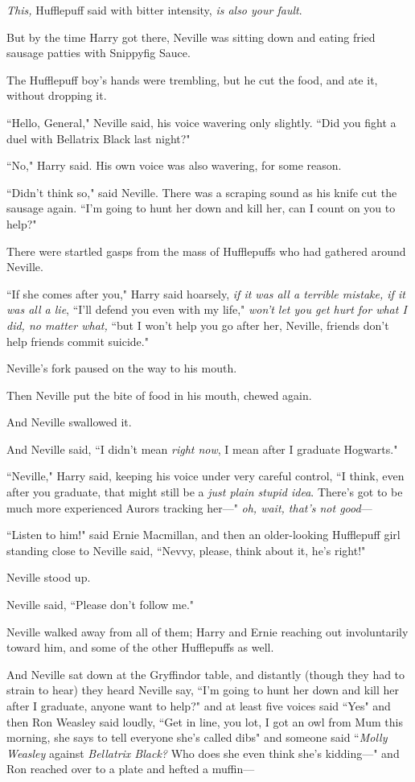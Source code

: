 \emph{This,} Hufflepuff said with bitter intensity, \emph{is also your fault}.

But by the time Harry got there, Neville was sitting down and eating fried sausage patties with Snippyfig Sauce.

The Hufflepuff boy's hands were trembling, but he cut the food, and ate it, without dropping it.

``Hello, General," Neville said, his voice wavering only slightly. ``Did you fight a duel with Bellatrix Black last night?"

``No," Harry said. His own voice was also wavering, for some reason.

``Didn't think so," said Neville. There was a scraping sound as his knife cut the sausage again. ``I'm going to hunt her down and kill her, can I count on you to help?"

There were startled gasps from the mass of Hufflepuffs who had gathered around Neville.

``If she comes after you," Harry said hoarsely, \emph{if it was all a terrible mistake, if it was all a lie}, ``I'll defend you even with my life," \emph{won't let you get hurt for what I did, no matter what,} ``but I won't help you go after her, Neville, friends don't help friends commit suicide."

Neville's fork paused on the way to his mouth.

Then Neville put the bite of food in his mouth, chewed again.

And Neville swallowed it.

And Neville said, ``I didn't mean \emph{right now}, I mean after I graduate Hogwarts."

``Neville," Harry said, keeping his voice under very careful control, ``I think, even after you graduate, that might still be a \emph{just plain stupid idea}. There's got to be much more experienced Aurors tracking her—" \emph{oh, wait, that's not good}—

``Listen to him!" said Ernie Macmillan, and then an older-looking Hufflepuff girl standing close to Neville said, ``Nevvy, please, think about it, he's right!"

Neville stood up.

Neville said, ``Please don't follow me."

Neville walked away from all of them; Harry and Ernie reaching out involuntarily toward him, and some of the other Hufflepuffs as well.

And Neville sat down at the Gryffindor table, and distantly (though they had to strain to hear) they heard Neville say, ``I'm going to hunt her down and kill her after I graduate, anyone want to help?" and at least five voices said ``Yes" and then Ron Weasley said loudly, ``Get in line, you lot, I got an owl from Mum this morning, she says to tell everyone she's called dibs" and someone said ``\emph{Molly Weasley} against \emph{Bellatrix Black?} Who does she even think she's kidding—" and Ron reached over to a plate and hefted a muffin—

